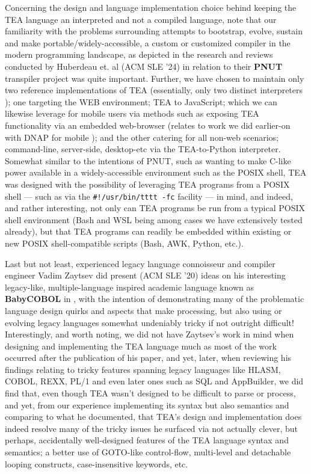 \documentclass[sigplan,screen]{acmart}
\begin{document}
Concerning the design and language implementation choice behind keeping the TEA language an interpreted and not a compiled language, note that our familiarity with the problems surrounding attempts to bootstrap, evolve, sustain and make portable/widely-accessible, a custom or customized compiler in the modern programming landscape, as depicted in the research and reviews conducted by Huberdeau et. al (ACM SLE '24) \cite{huberdeau2024selfcompiling} in relation to their \textbf{PNUT} transpiler project was quite important. Further, we have chosen to maintain only two reference implementations of TEA (essentially, only two distinct interpreters \cite{cli_tttt}); one targeting the WEB environment; TEA to JavaScript; which we can likewise leverage for mobile users via methods such as exposing TEA functionality via an embedded web-browser (relates to work we did earlier-on with DNAP for mobile \cite{lutalodnapintro2020}); and the other catering for all non-web scenarios; command-line, server-side, desktop-etc via the TEA-to-Python interpreter. Somewhat similar to the intentions of PNUT, such as wanting to make C-like power available in a widely-accessible environment such as the POSIX shell, TEA was designed with the possibility of leveraging TEA programs from a POSIX shell --- such as via the \texttt{\#!/usr/bin/tttt -fc} facility --- in mind, and indeed, and rather interesting, not only can TEA programs be run from a typical POSIX shell environment (Bash and WSL being among cases we have extensively tested already), but that TEA programs can readily be embedded within existing or new POSIX shell-compatible scripts (Bash, AWK, Python, etc.).

Last but not least, experienced legacy language connoisseur and compiler engineer Vadim Zaytsev did present (ACM SLE '20) ideas on his interesting legacy-like, multiple-language inspired academic language known as \textbf{BabyCOBOL} in \cite{zaytsev2020worstnightmare}, with the intention of demonstrating many of the problematic language design quirks and aspects that make processing, but also using or evolving legacy languages somewhat undeniably tricky if not outright difficult! Interestingly, and worth noting, we did not have Zaytsev's work in mind when designing and implementing the TEA language much as most of the work occurred after the publication of his paper, and yet, later, when reviewing his findings relating to tricky features spanning legacy languages like HLASM, COBOL, REXX, PL/1 and even later ones such as SQL and AppBuilder, we did find that, even though TEA wasn't designed to be difficult to parse or process, and yet, from our experience implementing its syntax but also semantics and comparing to what he documented, that TEA's design and implementation does indeed resolve many of the tricky issues he surfaced via not actually clever, but perhaps, accidentally well-designed features of the TEA language syntax and semantics; a better use of GOTO-like control-flow, multi-level and detachable looping constructs, case-insensitive keywords, etc. 
\end{document}
